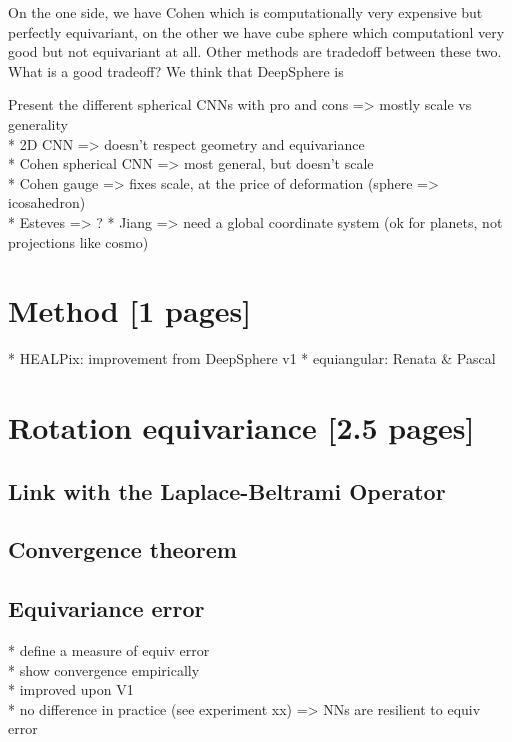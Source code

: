 \documentclass{article} %
\begin{document}
On the one side, we have Cohen which is computationally very expensive but perfectly equivariant, on the other we have cube sphere which computationl very good but not equivariant at all. Other methods are tradedoff between these two. What is a good tradeoff? We think that DeepSphere is

Present the different spherical CNNs with pro and cons => mostly scale vs generality\\
* 2D CNN => doesn't respect geometry and equivariance\\
* Cohen spherical CNN => most general, but doesn't scale\\
* Cohen gauge => fixes scale, at the price of deformation (sphere => icosahedron)\\
* Esteves => ?
* Jiang => need a global coordinate system (ok for planets, not projections like cosmo)\\

\section{Method [1 pages]}

* HEALPix: improvement from DeepSphere v1 \cite{perraudin2019deepsphere}
* equiangular: Renata \& Pascal

\section{Rotation equivariance [2.5 pages]}

\subsection{Link with the Laplace-Beltrami Operator}

\subsection{Convergence theorem}

\subsection{Equivariance error}

* define a measure of equiv error\\
* show convergence empirically\\
* improved upon V1\\
* no difference in practice (see experiment xx) => NNs are resilient to equiv error\\
\end{document}
